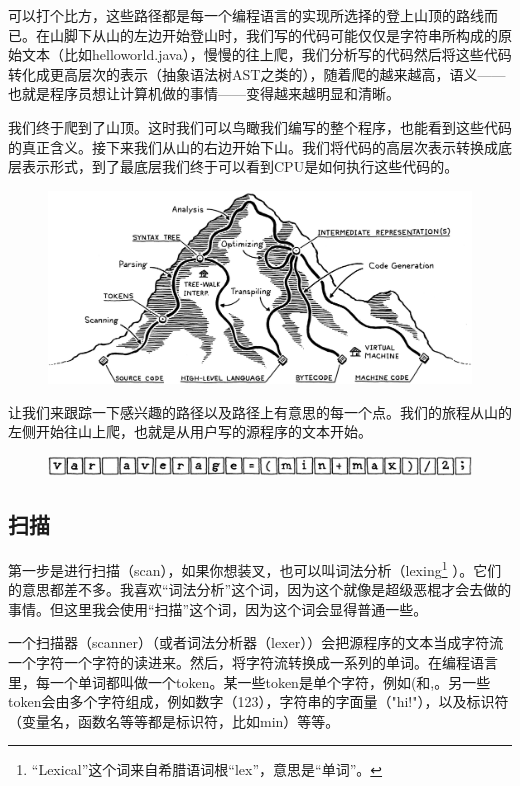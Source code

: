 \documentclass[cn,10pt,math=newtx,citestyle=gb7714-2015,bibstyle=gb7714-2015]{elegantbook}
\begin{document}
可以打个比方，这些路径都是每一个编程语言的实现所选择的登上山顶的路线而已。在山脚下从山的左边开始登山时，我们写的代码可能仅仅是字符串所构成的原始文本（比如helloworld.java），慢慢的往上爬，我们分析写的代码然后将这些代码转化成更高层次的表示（抽象语法树AST之类的），随着爬的越来越高，语义——也就是程序员想让计算机做的事情——变得越来越明显和清晰。

我们终于爬到了山顶。这时我们可以鸟瞰我们编写的整个程序，也能看到这些代码的真正含义。接下来我们从山的右边开始下山。我们将代码的高层次表示转换成底层表示形式，到了最底层我们终于可以看到CPU是如何执行这些代码的。

\begin{figure}[h]
\centering
\includegraphics[width=\textwidth]{./image/a-map-of-the-territory/mountain.png}
\end{figure}

让我们来跟踪一下感兴趣的路径以及路径上有意思的每一个点。我们的旅程从山的左侧开始往山上爬，也就是从用户写的源程序的文本开始。

\begin{figure}[h]
\centering
\includegraphics[width=\textwidth]{./image/a-map-of-the-territory/string.png}
\end{figure}

\subsection{扫描}

第一步是进行扫描（scan），如果你想装叉，也可以叫词法分析（lexing\footnote{“Lexical”这个词来自希腊语词根“lex”，意思是“单词”。} ）。它们的意思都差不多。我喜欢“词法分析”这个词，因为这个就像是超级恶棍才会去做的事情。但这里我会使用“扫描”这个词，因为这个词会显得普通一些。

一个扫描器（scanner）（或者词法分析器（lexer））会把源程序的文本当成字符流一个字符一个字符的读进来。然后，将字符流转换成一系列的单词。在编程语言里，每一个单词都叫做一个token。某一些token是单个字符，例如(和,。另一些token会由多个字符组成，例如数字（123），字符串的字面量（"hi!"），以及标识符（变量名，函数名等等都是标识符，比如min）等等。
\end{document}
